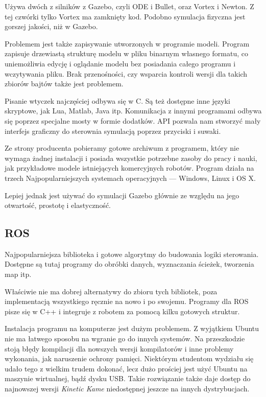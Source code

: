 Używa dwóch z silników z Gazebo, czyli ODE i Bullet, oraz Vortex i Newton. Z tej czwórki tylko Vortex ma zamknięty kod.
Podobno symulacja fizyczna jest gorszej jakości, niż w Gazebo.

Problemem jest także zapisywanie utworzonych w programie modeli.
Program zapisuje drzewiastą strukturę modelu w pliku binarnym własnego formatu, co uniemożliwia edycję i oglądanie modelu bez posiadania całego programu i wczytywania pliku.
Brak przenośności, czy wsparcia kontroli wersji dla takich zbiorów bajtów także jest problemem.

Pisanie wtyczek najczęściej odbywa się w C. Są też dostępne inne języki skryptowe, jak Lua, Matlab, Java itp.
Komunikacja z innymi programami odbywa się poprzez specjalne mosty w formie dodatków.
API pozwala nam stworzyć mały interfejs graficzny do sterownia symulacją poprzez przyciski i suwaki.

Ze strony producenta pobieramy gotowe archiwum z programem, który nie wymaga żadnej instalacji i posiada wszystkie potrzebne zasoby do pracy i nauki, jak przykładowe modele istniejących komercyjnych robotów.
Program działa na trzech Najpopularniejszych systemach operacyjnych --- Windows, Linux i OS X.

Lepiej jednak jest używać do symulacji Gazebo głównie ze względu na jego otwartość, prostotę i elastyczność.

\subsection{ROS}
Najpopularniejsza biblioteka i gotowe algorytmy do budowania logiki sterowania.
Dostępne są tutaj programy do obróbki danych, wyznaczania ścieżek, tworzenia map itp.

Właściwie nie ma dobrej alternatywy do zbioru tych bibliotek, poza implementacją wszystkiego ręcznie na nowo i po swojemu.
Programy dla ROS pisze się w C++ i integruje z robotem za pomocą kilku gotowych struktur.

Instalacja programu na komputerze jest dużym problemem.
Z wyjątkiem Ubuntu nie ma łatwego sposobu na wgranie go do innych systemów.
Na przeszkodzie stoją błędy kompilacji dla nowszych wersji kompilatorów i inne problemy wykonania, jak naruszenie ochrony pamięci. 
Niektórym studentom wydziału się udało tego z wielkim trudem dokonać, lecz dużo prościej jest użyć Ubuntu na maszynie wirtualnej, bądź dysku USB.
Takie rozwiązanie także daje dostęp do najnowszej wersji \emph{Kinetic Kame} niedostępnej jeszcze na innych dystrybucjach.

